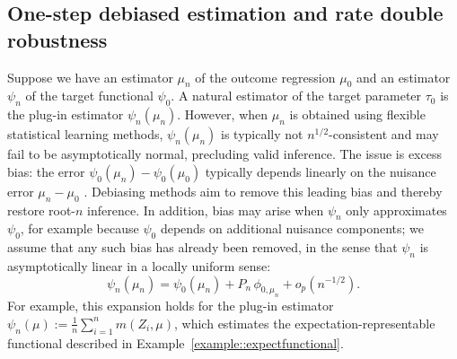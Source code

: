 \documentclass[11pt]{article}
\theoremstyle{plain}
\newtheorem{example}{Example}
\DeclareMathOperator*{\argmin}{argmin}
\begin{document}
 



\subsection{One-step debiased estimation and rate double robustness}
\label{section::prelimDR}


Suppose we have an estimator \(\mu_n\) of the outcome regression \(\mu_0\) and an
estimator \(\psi_n\) of the target functional \(\psi_0\). A natural estimator of the
target parameter \(\tau_0\) is the plug-in estimator \(\psi_n(\mu_n)\). However, when
\(\mu_n\) is obtained using flexible statistical learning methods,
\(\psi_n(\mu_n)\) is typically not \(n^{1/2}\)-consistent and may fail to be
asymptotically normal, precluding valid inference. The issue is excess bias: the
error \(\psi_0(\mu_n)-\psi_0(\mu_0)\) typically depends linearly on the nuisance error
\(\mu_n-\mu_0\) \citep{vanderLaanRose2011}. Debiasing methods aim to remove this
leading bias and thereby restore root-\(n\) inference. In addition, bias may arise
when \(\psi_n\) only approximates \(\psi_0\), for example because \(\psi_0\) depends on
additional nuisance components; we assume that any such bias has already been
removed, in the sense that \(\psi_n\) is asymptotically linear in a locally uniform
sense:
\[
\psi_n(\mu_n)
= \psi_0(\mu_n)
+ P_n\,\phi_{0,\mu_n}
+ o_p(n^{-1/2}).
\]
For example, this expansion holds for the plug-in estimator
\(\psi_n(\mu) := \frac{1}{n}\sum_{i=1}^n m(Z_i,\mu)\), which estimates the
expectation-representable functional described in
Example~\ref{example::expectfunctional}.
\end{document}
